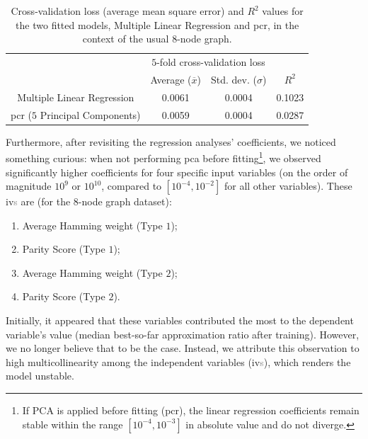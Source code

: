 \begin{table}[H]
  \centering
  \begin{tabular}{|c|cc|c|}
  \hline
  \rowcolor[HTML]{FFFFFF} 
  \cellcolor[HTML]{FFFFFF}                               & \multicolumn{2}{c|}{\cellcolor[HTML]{FFFFFF}$5$-fold cross-validation loss} & \cellcolor[HTML]{FFFFFF} \\ \cline{2-3}
  \rowcolor[HTML]{FFFFFF} 
  \multirow{-2}{*}{\cellcolor[HTML]{FFFFFF}Model ($8$-node graph)} &
    \multicolumn{1}{c|}{\cellcolor[HTML]{FFFFFF}Average ($\overline{x}$)} &
    Std. dev. ($\sigma$) &
    \multirow{-2}{*}{\cellcolor[HTML]{FFFFFF}$R^2$} \\ \hline
  \rowcolor[HTML]{EFEFEF} 
  \cellcolor[HTML]{FFFFFF}Multiple Linear Regression     & \multicolumn{1}{c|}{\cellcolor[HTML]{EFEFEF}0.0061}         & 0.0004        & 0.1023                   \\ \hline
  \rowcolor[HTML]{EFEFEF} 
  \cellcolor[HTML]{FFFFFF}\acrshort{pcr} ($5$ Principal Components) & \multicolumn{1}{c|}{\cellcolor[HTML]{EFEFEF}0.0059}         & 0.0004        & 0.0287                   \\ \hline
  \end{tabular}
  \caption{Cross-validation loss (average mean square error) and $R^2$ values for the two fitted models, Multiple Linear Regression and \acrshort{pcr}, in the context of the usual $8$-node graph.}
  \label{tab:Scaled_Median_BSF_Table_8-node}
\end{table}

Furthermore, after revisiting the regression analyses' coefficients, we noticed something curious: when not performing \acrshort{pca} before fitting\footnote{If PCA is applied before fitting (\acrshort{pcr}), the linear regression coefficients remain stable within the range \([10^{-4}, 10^{-3}]\) in absolute value and do not diverge.}, we observed significantly higher coefficients for four specific input variables (on the order of magnitude \(10^9\) or \(10^{10}\), compared to \([10^{-4}, 10^{-2}]\) for all other variables). These \acrshort{iv}\textcolor{gray}{s} are (for the $8$-node graph dataset):
\begin{enumerate}
    \item Average Hamming weight (Type $1$);
    \item Parity Score (Type $1$);
    \item Average Hamming weight (Type $2$);
    \item Parity Score (Type $2$).
\end{enumerate}
Initially, it appeared that these variables contributed the most to the dependent variable's value (median best-so-far approximation ratio after training). However, we no longer believe that to be the case. Instead, we attribute this observation to high multicollinearity among the independent variables (\acrshort{iv}\textcolor{gray}{s}), which renders the model unstable.

